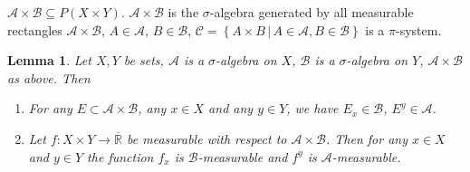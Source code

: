 \documentclass{article}
\newtheorem{lemma}{Lemma}  \numberwithin{lemma}{section}
\newcommand{\setdef}[2]{\left\{\left.#1\,\right|\,#2\right\}}
\begin{document}
$\mathcal A \times \mathcal B \subseteq P(X \times Y)$. $\mathcal A \times \mathcal B$ is the $\sigma$-algebra generated by all measurable rectangles
$\mathcal A \times \mathcal B$, $A \in \mathcal A$, $B \in \mathcal B$, $\mathcal C = \setdef{A \times B}{A \in \mathcal A, B \in \mathcal B}$ is a $\pi$-system.

\begin{lemma} %
  Let $X, Y$ be sets, $\mathcal A$ is a $\sigma$-algebra on $X$, $\mathcal B$ is a $\sigma$-algebra on $Y$, $\mathcal A \times \mathcal B$ as above. Then
  \begin{enumerate}
    \item For any $E \subset \mathcal A \times \mathcal B$, any $x \in X$ and any $y \in Y$, we have $E_x \in \mathcal B$, $E^y \in \mathcal A$.
    \item Let $f: X \times Y \to \overline{\mathbb R}$ be measurable with respect to $\mathcal A \times \mathcal B$.
      Then for any $x \in X$ and $y \in Y$ the function $f_x$ is $\mathcal B$-measurable and $f^y$ is $\mathcal A$-measurable.
  \end{enumerate}
\end{lemma}
\end{document}
